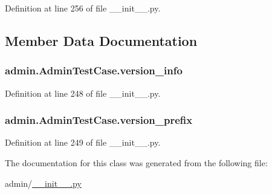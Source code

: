 Definition at line 256 of file \-\_\-\-\_\-init\-\_\-\-\_\-.\-py.



\subsection{Member Data Documentation}
\hypertarget{classadmin_1_1AdminTestCase_a235ad774d40bba3600cf09b79dc9f209}{
\subsubsection[{version\-\_\-info}]{\setlength{\rightskip}{0pt plus 5cm}admin.\-Admin\-Test\-Case.\-version\-\_\-info}}\label{classadmin_1_1AdminTestCase_a235ad774d40bba3600cf09b79dc9f209}


Definition at line 248 of file \-\_\-\-\_\-init\-\_\-\-\_\-.\-py.

\hypertarget{classadmin_1_1AdminTestCase_a6b12aab33be61651698f4b8810678168}{
\subsubsection[{version\-\_\-prefix}]{\setlength{\rightskip}{0pt plus 5cm}admin.\-Admin\-Test\-Case.\-version\-\_\-prefix}}\label{classadmin_1_1AdminTestCase_a6b12aab33be61651698f4b8810678168}


Definition at line 249 of file \-\_\-\-\_\-init\-\_\-\-\_\-.\-py.



The documentation for this class was generated from the following file\-:\begin{DoxyCompactItemize}
\item 
admin/\hyperlink{____init_____8py}{\-\_\-\-\_\-init\-\_\-\-\_\-.\-py}\end{DoxyCompactItemize}
